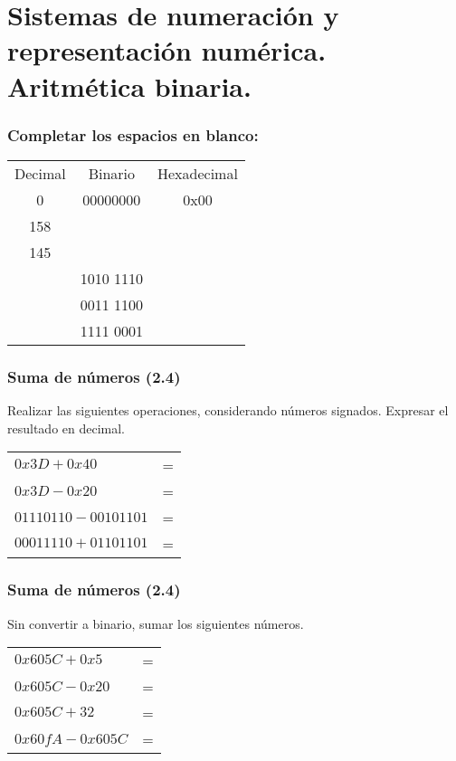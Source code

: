 \section{Sistemas de numeración y representación numérica. Aritmética binaria.}
\setcounter{subsection}{2}

\subsubsection{Completar los espacios en blanco:}
\begin{tabular}{ccc}
  Decimal&Binario&Hexadecimal\\
  0&00000000&0x00 \\
  158& &\underspace\\
  145&\underspace &\underspace \\
  \underspace&1010 1110&\underspace \\
  \underspace&0011 1100&\underspace \\
  \underspace&1111 0001&\underspace \\
\end{tabular}

\subsubsection{Suma de números (2.4)}
Realizar las siguientes operaciones, considerando números signados. Expresar el resultado en decimal.
\vspace{10mm}

\begin{tabular}{lc}
$0x3D + 0x40 $&=\underspace\\
$0x3D - 0x20 $&=\underspace\\
$01110110 - 00101101$&=\underspace\\
$00011110 + 01101101$&=\underspace\\

\end{tabular}

\subsubsection{Suma de números (2.4)}
Sin convertir a binario, sumar los siguientes números.

\begin{tabular}{lc}
$0x605C + 0x5 $&=\underspace\\
$0x605C - 0x20 $&=\underspace\\
$0x605C + 32 $&=\underspace\\
$0x60fA - 0x605C $&=\underspace\\
\end{tabular}


